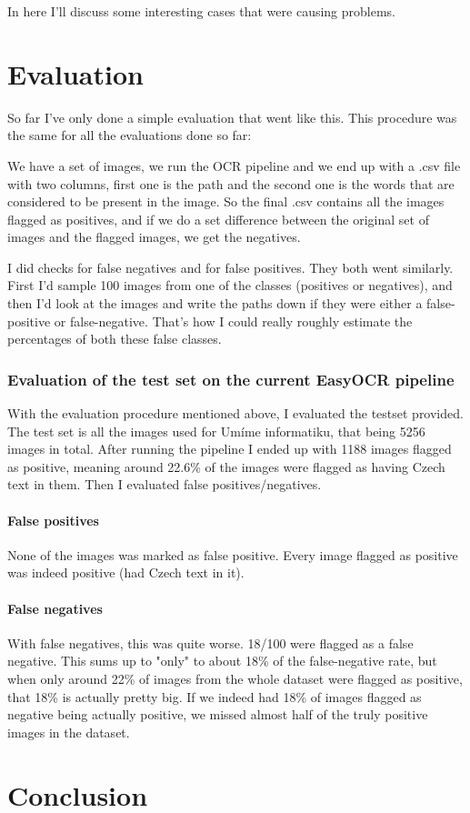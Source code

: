 \documentclass[
  digital,     %
  oneside,     %
  nosansbold,  %
  nocolorbold, %
  nolof,         %
  nolot,         %
]{fithesis4}
\begin{document}
In here I'll discuss some interesting cases that were causing problems.

\chapter{Evaluation}

So far I've only done a simple evaluation that went like this. This procedure was the same for all the evaluations done so far:

We have a set of images, we run the OCR pipeline and we end up with a .csv file with two columns, first one is the path and the second one is the words that are considered to be present in the image. So the final .csv contains all the images flagged as positives, and if we do a set difference between the original set of images and the flagged images, we get the negatives.

I did checks for false negatives and for false positives. They both went similarly. First I'd sample 100 images from one of the classes (positives or negatives), and then I'd look at the images and write the paths down if they were either a false-positive or false-negative. That's how I could really roughly estimate the percentages of both these false classes.

\subsection{Evaluation of the test set on the current EasyOCR pipeline}

With the evaluation procedure mentioned above, I evaluated the testset provided. The test set is all the images used for Umíme informatiku, that being 5256 images in total. After running the pipeline I ended up with 1188 images flagged as positive, meaning around 22.6\% of the images were flagged as having Czech text in them.
Then I evaluated false positives/negatives.

\subsubsection{False positives}
None of the images was marked as false positive. Every image flagged as positive was indeed positive (had Czech text in it).

\subsubsection{False negatives}
With false negatives, this was quite worse. 18/100 were flagged as a false negative. This sums up to "only" to about 18\% of the false-negative rate, but when only around 22\% of images from the whole dataset were flagged as positive, that 18\% is actually pretty big. If we indeed had 18\% of images flagged as negative being actually positive, we missed almost half of the truly positive images in the dataset.

\chapter{Conclusion}
\end{document}
